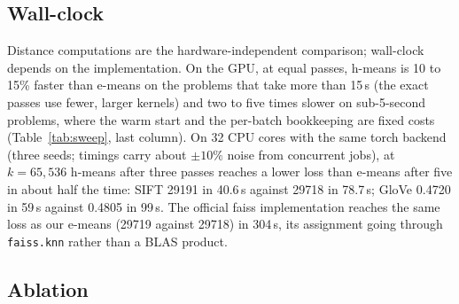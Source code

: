 \documentclass[11pt]{article}
\newcommand{\hm}{h-means}
\newcommand{\emeans}{e-means}
\begin{document}
\subsection{Wall-clock}
\label{sec:cpu}

Distance computations are the hardware-independent comparison; wall-clock depends on the implementation. On the GPU, at equal passes, \hm{} is 10 to 15\% faster than \emeans{} on the problems that take more than 15\,s (the exact passes use fewer, larger kernels) and two to five times slower on sub-5-second problems, where the warm start and the per-batch bookkeeping are fixed costs (Table~\ref{tab:sweep}, last column). On 32 CPU cores with the same torch backend (three seeds; timings carry about $\pm10\%$ noise from concurrent jobs), at $k=65{,}536$ \hm{} after three passes reaches a lower loss than \emeans{} after five in about half the time: SIFT 29191 in 40.6\,s against 29718 in 78.7\,s; GloVe 0.4720 in 59\,s against 0.4805 in 99\,s. The official faiss implementation reaches the same loss as our \emeans{} (29719 against 29718) in 304\,s, its assignment going through \texttt{faiss.knn} rather than a BLAS product.

\subsection{Ablation}
\label{sec:ablation}
\end{document}
